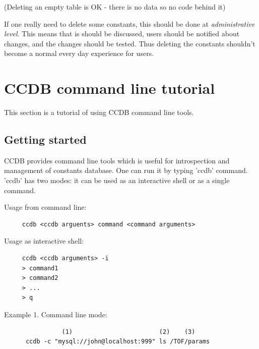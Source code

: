 \documentclass{article}
\begin{document}
(Deleting an empty table is OK - there is no data so no code behind it)


If one really need to delete some constants, this should be done at 
\textit{administrative level}. This means that is should be discussed, users 
should be notified about changes, and the changes should be tested. 
Thus deleting the constants shouldn't become a normal every day experience 
for users.

\newpage
\section{CCDB command line tutorial}\label{sec:console_tools_tutorial}

This section is a tutorial of using CCDB command line tools.


\subsection {Getting started}

CCDB provides command line tools which is useful for introspection and 
management of constants database. One can run it by typing 'ccdb' command.
'ccdb' has two modes: it can be used as an interactive shell or as 
a single command.
\vspace{1 em}


Usage from command line:
\begin{verbatim}
     ccdb <ccdb arguents> command <command arguments>
\end{verbatim}
\vspace{1 em}

Usage as interactive shell:
\begin{verbatim}
     ccdb <ccdb arguments> -i
     > command1
     > command2
     > ...
     > q
\end{verbatim}
\vspace{1 em}


Example 1. Command line mode:
\begin{verbatim}
                (1)                        (2)    (3)
      ccdb -c "mysql://john@localhost:999" ls /TOF/params

\end{verbatim}
\vspace{1 em}
\end{document}
